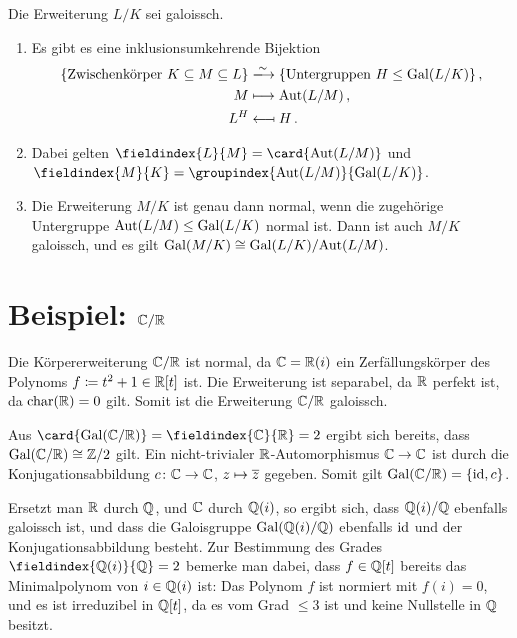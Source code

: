 \begin{theorem}
  Die Erweiterung $L/K$ sei galoissch.
  \begin{enumerate}
    \item
      Es gibt es eine inklusionsumkehrende Bijektion
      \begin{align*}
                                \{ \text{Zwischenkörper $K \subseteq M \subseteq L$} \}
        &\xlongrightarrow{\sim} \{ \text{Untergruppen $H \subgroup \Gal{L/K}$} \} \,, \\
                                M
        &\longmapsto            \Aut{L/M} \,, \\
                                L^H
        &\longmapsfrom          H \,.
      \end{align*}
    \item
      Dabei gelten $\fieldindex{L}{M} = \card{\Aut{L/M}}$ und $\fieldindex{M}{K} = \groupindex{\Aut{L/M}}{\Gal{L/K}}$.
    \item
      Die Erweiterung $M/K$ ist genau dann normal, wenn die zugehörige Untergruppe $\operatorname{Aut}(L/M) \mathrel{\leq} \operatorname{Gal}(L/K)$ normal ist.
      Dann ist auch $M/K$ galoissch, und es gilt $\operatorname{Gal}(M/K) \cong \operatorname{Gal}(L/K) / {\operatorname{Aut}(L/M)}$.
  \end{enumerate}
\end{theorem}





\section{Beispiel: \texorpdfstring{$\mathbb{C}/\mathbb{R}$}{C/R}}

Die Körpererweiterung $\mathbb{C}/\mathbb{R}$ ist normal, da $\mathbb{C} = \mathbb{R}(i)$ ein Zerfällungskörper des Polynoms $f \coloneqq t^2 + 1 \in \mathbb{R}[t]$ ist.
Die Erweiterung ist separabel, da $\mathbb{R}$ perfekt ist, da $\operatorname{char}(\mathbb{R}) = 0$ gilt.
Somit ist die Erweiterung $\mathbb{C}/\mathbb{R}$ galoissch.

Aus $\card{\Gal{\Complex/\Real}} = \fieldindex{\Complex}{\Real} = 2$ ergibt sich bereits, dass $\operatorname{Gal}(\mathbb{C}/\mathbb{R}) \cong \mathbb{Z}/2$ gilt.
Ein nicht-trivialer $\mathbb{R}$-Automorphismus $\mathbb{C} \to \mathbb{C}$ ist durch die Konjugationsabbildung $c \colon \mathbb{C} \to \mathbb{C}$, $z \mapsto \overline{z}$ gegeben.
Somit gilt $\operatorname{Gal}(\mathbb{C}/\mathbb{R}) = \{\operatorname{id}, c\}$.

Ersetzt man $\mathbb{R}$ durch $\mathbb{Q}$, und $\mathbb{C}$ durch $\mathbb{Q}(i)$, so ergibt sich, dass $\mathbb{Q}(i)/\mathbb{Q}$ ebenfalls galoissch ist, und dass die Galoisgruppe $\operatorname{Gal}(\mathbb{Q}(i)/\mathbb{Q})$ ebenfalls $\operatorname{id}$ und der Konjugationsabbildung besteht.
Zur Bestimmung des Grades $\fieldindex{\Rational(i)}{\Rational} = 2$ bemerke man dabei, dass $f \in \mathbb{Q}[t]$ bereits das Minimalpolynom von $i \in \mathbb{Q}(i)$ ist:
Das Polynom $f$ ist normiert mit $f(i) = 0$, und es ist irreduzibel in $\mathbb{Q}[t]$, da es vom Grad $\leq 3$ ist und keine Nullstelle in $\mathbb{Q}$ besitzt.

